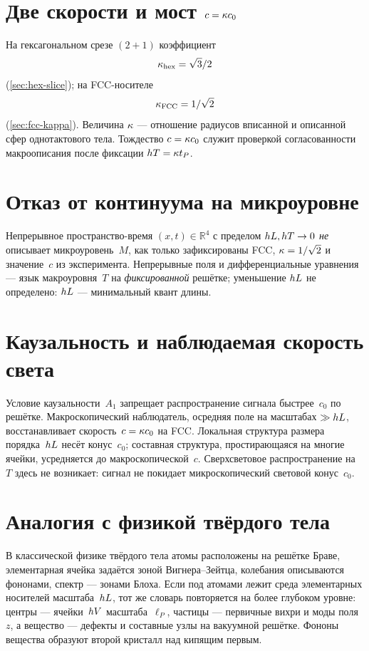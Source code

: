 \section{Две скорости и мост $c=\kappa c_0$}
\label{sec:two-c}

На гексагональном срезе $(2{+}1)$ коэффициент
\[
\kappa_{\mathrm{hex}}=\sqrt{3}/2
\]
(\cref{sec:hex-slice}); на FCC-носителе
\[
\kappa_{\mathrm{FCC}}=1/\sqrt{2}
\]
(\cref{sec:fcc-kappa}).
Величина $\kappa$ --- отношение радиусов вписанной и описанной сфер однотактового тела.
Тождество $c=\kappa c_0$ служит проверкой согласованности макроописания
после фиксации $hT=\kappa t_P$.

\section{Отказ от континуума на микроуровне}
\label{sec:no-continuum-carrier}

Непрерывное пространство-время $(x,t)\in\mathbb{R}^4$ с пределом $hL,hT\to 0$
\emph{не} описывает микроуровень~$M$, как только зафиксированы FCC, $\kappa=1/\sqrt{2}$
и значение~$c$ из эксперимента.
Непрерывные поля и дифференциальные уравнения --- язык макроуровня~$T$
на \emph{фиксированной} решётке; уменьшение $hL$ не определено:
$hL$ --- минимальный квант длины.

\section{Каузальность и наблюдаемая скорость света}

Условие каузальности~$A_1$ запрещает распространение сигнала быстрее~$c_0$ по решётке.
Макроскопический наблюдатель, осредняя поле на масштабах $\gg hL$,
восстанавливает скорость~$c=\kappa c_0$ на FCC.
Локальная структура размера порядка~$hL$ несёт конус~$c_0$;
составная структура, простирающаяся на многие ячейки, усредняется до макроскопической~$c$.
Сверхсветовое распространение на~$T$ здесь не возникает: сигнал не покидает
микроскопический световой конус~$c_0$.

\section{Аналогия с физикой твёрдого тела}

В классической физике твёрдого тела атомы расположены на решётке Браве,
элементарная ячейка задаётся зоной Вигнера--Зейтца, колебания описываются фононами,
спектр --- зонами Блоха.
Если под атомами лежит среда элементарных носителей масштаба~$hL$,
тот же словарь повторяется на более глубоком уровне:
центры --- ячейки~$hV$ масштаба~$\ell_P$,
частицы --- первичные вихри и моды поля~$z$,
а вещество --- дефекты и составные узлы на вакуумной решётке.
Фононы вещества образуют второй кристалл над кипящим первым.


